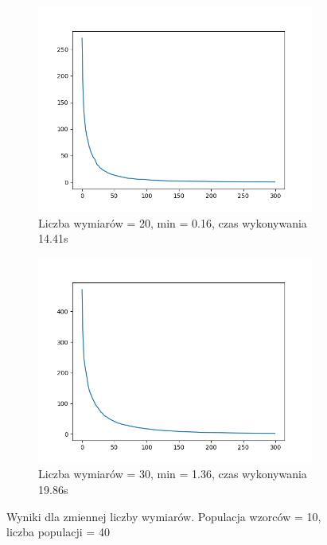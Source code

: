 \documentclass[12pt]{article}
\begin{document}
\begin{figure}[H]
    \centering
    \begin{subfigure}{0.32\textwidth}
        \centering
        \includegraphics[width=\linewidth]{plots/s4.png}
        \caption{Liczba wymiarów = 20, min = 0.16, czas wykonywania 14.41s}
    \end{subfigure}
    \begin{subfigure}{0.32\textwidth}
        \centering
        \includegraphics[width=\linewidth]{plots/s5.png}
        \caption{Liczba wymiarów = 30, min = 1.36, czas wykonywania 19.86s}
    \end{subfigure}
    \caption{Wyniki dla zmiennej liczby wymiarów. Populacja wzorców = 10, liczba populacji = 40}
\end{figure}
\end{document}
